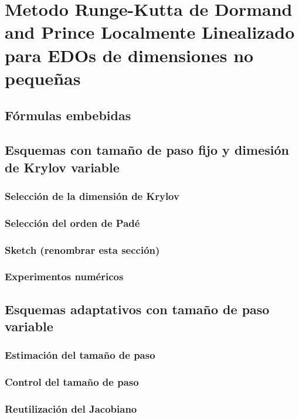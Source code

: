 \chapter{Metodo Runge-Kutta de Dormand and Prince Localmente Linealizado para EDOs de
dimensiones no pequeñas}\label{chapter:lldp}

\section{Fórmulas embebidas}


\section{Esquemas con tamaño de paso fijo y dimesión de Krylov variable}

\subsection{Selección de la dimensión de Krylov}

\subsection{Selección del orden de Padé}

\subsection{Sketch (renombrar esta sección)}

\subsection{Experimentos numéricos}


\section{Esquemas adaptativos con tamaño de paso variable}

\subsection{Estimación del tamaño de paso}

\subsection{Control del tamaño de paso}

\subsection{Reutilización del Jacobiano}

